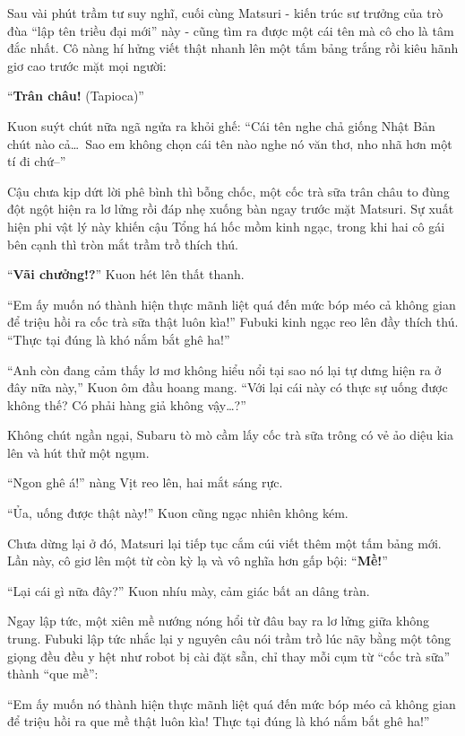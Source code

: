 \documentclass[../main.tex]{subfiles}
\begin{document}
\ct

Sau vài phút trầm tư suy nghĩ, cuối cùng Matsuri - kiến trúc sư trưởng của trò đùa ``lập tên triều đại mới'' này - cũng tìm ra được một cái tên mà cô cho là tâm đắc nhất. Cô nàng hí hửng viết thật nhanh lên một tấm bảng trắng rồi kiêu hãnh giơ cao trước mặt mọi người:

``\textbf{Trân châu!} (Tapioca)''

Kuon suýt chút nữa ngã ngửa ra khỏi ghế: ``Cái tên nghe chả giống Nhật Bản chút nào cả\dots\ Sao em không chọn cái tên nào nghe nó văn thơ, nho nhã hơn một tí đi chứ--''

Cậu chưa kịp dứt lời phê bình thì bỗng chốc, một cốc trà sữa trân châu to đùng đột ngột hiện ra lơ lửng rồi đáp nhẹ xuống bàn ngay trước mặt Matsuri. Sự xuất hiện phi vật lý này khiến cậu Tổng há hốc mồm kinh ngạc, trong khi hai cô gái bên cạnh thì tròn mắt trầm trồ thích thú.


``\textbf{Vãi chưởng!?}'' Kuon hét lên thất thanh.

``Em ấy muốn nó thành hiện thực mãnh liệt quá đến mức bóp méo cả không gian để triệu hồi ra cốc trà sữa thật luôn kìa!'' Fubuki kinh ngạc reo lên đầy thích thú. ``Thực tại đúng là khó nắm bắt ghê ha!''

``Anh còn đang cảm thấy lơ mơ không hiểu nổi tại sao nó lại tự dưng hiện ra ở đây nữa này,'' Kuon ôm đầu hoang mang. ``Với lại cái này có thực sự uống được không thế? Có phải hàng giả không vậy\dots?''

Không chút ngần ngại, Subaru tò mò cầm lấy cốc trà sữa trông có vẻ ảo diệu kia lên và hút thử một ngụm.

``Ngon ghê á!'' nàng Vịt reo lên, hai mắt sáng rực.

``Ủa, uống được thật này!'' Kuon cũng ngạc nhiên không kém.

Chưa dừng lại ở đó, Matsuri lại tiếp tục cắm cúi viết thêm một tấm bảng mới. Lần này, cô giơ lên một từ còn kỳ lạ và vô nghĩa hơn gấp bội: ``\textbf{Mề!}''

``Lại cái gì nữa đây?'' Kuon nhíu mày, cảm giác bất an dâng tràn.

Ngay lập tức, một xiên mề nướng nóng hổi từ đâu bay ra lơ lửng giữa không trung. Fubuki lập tức nhắc lại y nguyên câu nói trầm trồ lúc nãy bằng một tông giọng đều đều y hệt như robot bị cài đặt sẵn, chỉ thay mỗi cụm từ ``cốc trà sữa'' thành ``que mề'':

``Em ấy muốn nó thành hiện thực mãnh liệt quá đến mức bóp méo cả không gian để triệu hồi ra que mề thật luôn kìa! Thực tại đúng là khó nắm bắt ghê ha!''
\end{document}
